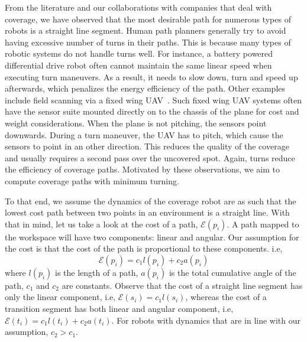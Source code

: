 \documentclass[../main.tex]{subfiles}
\begin{document}
From the literature and our collaborations with companies that deal with coverage, we have observed that the most desirable path for numerous types of robots is a straight line segment. Human path planners generally try to avoid having excessive number of turns in their paths. This is because many types of robotic systems do not handle turns well. For instance, a battery powered differential drive robot often cannot maintain the same linear speed when executing turn maneuvers. As a result, it needs to slow down, turn and speed up afterwards, which penalizes the energy efficiency of the path. Other examples include field scanning via a fixed wing UAV~\cite{frew2004vision}. Such fixed wing UAV systems often have the sensor suite mounted directly on to the chassis of the plane for cost and weight considerations. When the plane is not pitching, the sensors point downwards. During a turn maneuver, the UAV has to pitch, which cause the sensors to point in an other direction. This reduces the quality of the coverage and usually requires a second pass over the uncovered spot. Again, turns reduce the efficiency of coverage paths. Motivated by these observations, we aim to compute coverage paths with minimum turning. %

To that end, we assume the dynamics of the coverage robot are as such that the lowest cost path between two points in an environment is a straight line. With that in mind, let us take a look at the cost of a path, $\mathcal{E}(p_i)$. A path mapped to the workspace will have two components: linear and angular. Our assumption for the cost is that the cost of the path is proportional to these components. i.e,
\begin{equation}
	\mathcal{E}(p_i)=c_1l(p_i)+c_2a(p_i)
\end{equation}
where $l(p_i)$ is the length of a path, $a(p_i)$ is the total cumulative angle of the path, $c_1$ and $c_2$ are constants. Observe that the cost of a straight line segment has only the linear component, i.e, $\mathcal{E}(s_i)=c_1l(s_i)$, whereas the cost of a transition segment has both linear and angular component, i.e, $\mathcal{E}(t_i)=c_1l(t_i)+c_2a(t_i)$. For robots with dynamics that are in line with our assumption, $c_2 > c_1$.
\end{document}

